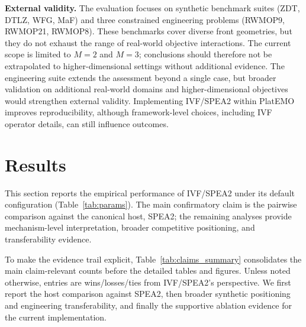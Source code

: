 \documentclass[pdflatex,sn-mathphys-ay]{sn-jnl}%
\theoremstyle{thmstyleone}%
\theoremstyle{thmstyletwo}%
\theoremstyle{thmstylethree}%
\begin{document}
\textbf{External validity.} The evaluation focuses on synthetic benchmark suites (ZDT, DTLZ, WFG, MaF) and three constrained engineering problems (RWMOP9, RWMOP21, RWMOP8). These benchmarks cover diverse front geometries, but they do not exhaust the range of real-world objective interactions. The current scope is limited to $M=2$ and $M=3$; conclusions should therefore not be extrapolated to higher-dimensional settings without additional evidence. The engineering suite extends the assessment beyond a single case, but broader validation on additional real-world domains and higher-dimensional objectives would strengthen external validity. Implementing IVF/SPEA2 within PlatEMO improves reproducibility, although framework-level choices, including IVF operator details, can still influence outcomes.%


\section{Results}\label{sec:results}

This section reports the empirical performance of IVF/SPEA2 under its default configuration (Table~\ref{tab:params}). The main confirmatory claim is the pairwise comparison against the canonical host, SPEA2; the remaining analyses provide mechanism-level interpretation, broader competitive positioning, and transferability evidence.

To make the evidence trail explicit, Table~\ref{tab:claims_summary} consolidates the main claim-relevant counts before the detailed tables and figures. Unless noted otherwise, entries are wins/losses/ties from IVF/SPEA2's perspective. We first report the host comparison against SPEA2, then broader synthetic positioning and engineering transferability, and finally the supportive ablation evidence for the current implementation.
\end{document}
